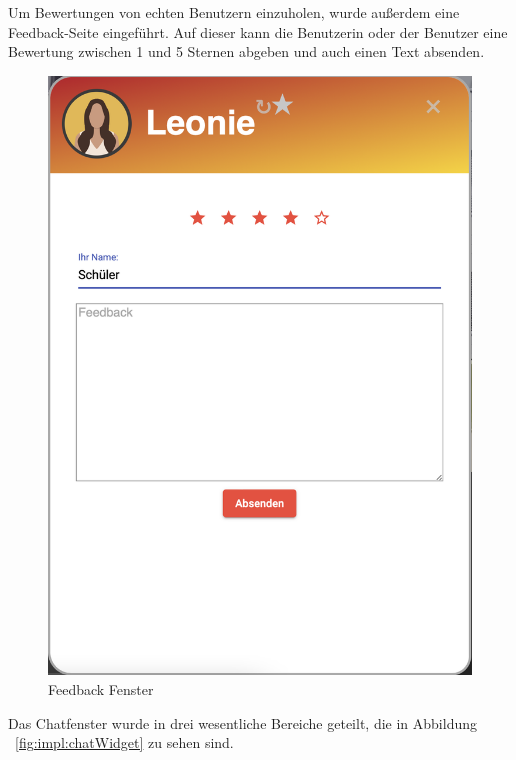 Um Bewertungen von echten Benutzern einzuholen, wurde außerdem eine Feedback-Seite eingeführt.
Auf dieser kann die Benutzerin oder der Benutzer eine Bewertung zwischen 1 und 5 Sternen abgeben und auch einen Text absenden.

\begin{figure}[hbt!]
    \centering
    \includegraphics[scale=0.3]{pics/feedback}
    \caption{Feedback Fenster}
    \label{fig:impl:feedback}
\end{figure}

Das Chatfenster wurde in drei wesentliche Bereiche geteilt, die in Abbildung ~\ref{fig:impl:chatWidget} zu sehen sind.

